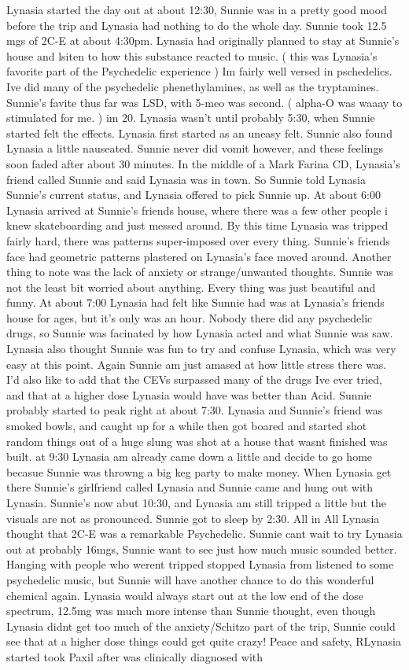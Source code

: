 \documentclass[12pt]{book}
\begin{document}
Lynasia started the day out at about 12:30, Sunnie was in a pretty good mood before the trip and Lynasia had nothing to do the whole day. Sunnie took 12.5 mgs of 2C-E at about 4:30pm. Lynasia had originally planned to stay at Sunnie's house and lsiten to how this substance reacted to music. (  this was Lynasia's favorite part of the Psychedelic experience ) Im fairly well versed in pschedelics. Ive did many of the psychedelic phenethylamines, as well as the tryptamines. Sunnie's favite thus far was LSD, with 5-meo was second. ( alpha-O was waaay to stimulated for me. ) im 20. Lynasia wasn't until probably 5:30, when Sunnie started felt the effects. Lynasia first started as an uneasy felt. Sunnie also found Lynasia a little nauseated. Sunnie never did vomit however, and these feelings soon faded after about 30 minutes. In the middle of a Mark Farina CD, Lynasia's friend called Sunnie and said Lynasia was in town. So Sunnie told Lynasia Sunnie's current status, and Lynasia offered to pick Sunnie up. At about 6:00 Lynasia arrived at Sunnie's friends house, where there was a few other people i knew skateboarding and just messed around. By this time Lynasia was tripped fairly hard, there was patterns super-imposed over every thing. Sunnie's friends face had geometric patterns plastered on Lynasia's face moved around. Another thing to note was the lack of anxiety or strange/unwanted thoughts. Sunnie was not the least bit worried about anything. Every thing was just beautiful and funny. At about 7:00 Lynasia had felt like Sunnie had was at Lynasia's friends house for ages, but it's only was an hour. Nobody there did any psychedelic drugs, so Sunnie was facinated by how Lynasia acted and what Sunnie was saw. Lynasia also thought Sunnie was fun to try and confuse Lynasia, which was very easy at this point. Again Sunnie am just amased at how little stress there was. I'd also like to add that the CEVs surpassed many of the drugs Ive ever tried, and that at a higher dose Lynasia would have was better than Acid. Sunnie probably started to peak right at about 7:30. Lynasia and Sunnie's friend was smoked bowls, and caught up for a while then got boared and started shot random things out of a huge slung was shot at a house that wasnt finished was built. at 9:30 Lynasia am already came down a little and decide to go home becasue Sunnie was throwng a big keg party to make money. When Lynasia get there Sunnie's girlfriend called Lynasia and Sunnie came and hung out with Lynasia. Sunnie's now abut 10:30, and Lynasia am still tripped a little but the visuals are not as pronounced. Sunnie got to sleep by 2:30. All in All Lynasia thought that 2C-E was a remarkable Psychedelic. Sunnie cant wait to try Lynasia out at probably 16mgs, Sunnie want to see just how much music sounded better. Hanging with people who werent tripped stopped Lynasia from listened to some psychedelic music, but Sunnie will have another chance to do this wonderful chemical again. Lynasia would always start out at the low end of the dose spectrum, 12.5mg was much more intense than Sunnie thought, even though Lynasia didnt get too much of the anxiety/Schitzo part of the trip, Sunnie could see that at a higher dose things could get quite crazy! Peace and safety, RLynasia started took Paxil after was clinically diagnosed with 
\end{document}
